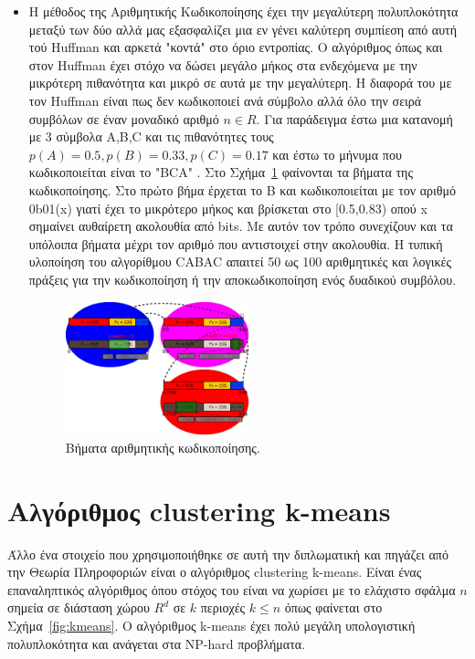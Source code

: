 \begin{itemize}
\newpage
  \item Η μέθοδος της Αριθμητικής Κωδικοποίησης έχει την μεγαλύτερη πολυπλοκότητα μεταξύ των δύο αλλά μας εξασφαλίζει μια εν γένει καλύτερη συμπίεση από αυτή τού Huffman και αρκετά "κοντά" στο όριο εντροπίας. Ο αλγόριθμος όπως και στον Huffman έχει στόχο να δώσει μεγάλο μήκος στα ενδεχόμενα με την μικρότερη πιθανότητα και μικρό σε αυτά με την μεγαλύτερη. Η διαφορά του με τον Huffman είναι πως δεν κωδικοποιεί ανά σύμβολο αλλά όλο την σειρά συμβόλων σε έναν μοναδικό αριθμό $n \in R$. Για παράδειγμα έστω μια κατανομή με 3 σύμβολα A,B,C και τις πιθανότητες τους $ p(A) = 0.5, p(B) = 0.33, p(C) = 0.17 $ και έστω το μήνυμα που κωδικοποιείται είναι το "BCA" . Στο Σχήμα~\ref{fig:ac} φαίνονται τα βήματα της κωδικοποίησης. Στο πρώτο βήμα έρχεται το B και κωδικοποιείται με τον αριθμό 0b01(x) γιατί έχει το μικρότερο μήκος και βρίσκεται στο [0.5,0.83) οπού x σημαίνει αυθαίρετη ακολουθία από bits. Με αυτόν τον τρόπο συνεχίζουν και τα υπόλοιπα βήματα μέχρι τον αριθμό που αντιστοιχεί στην ακολουθία. Η τυπική υλοποίηση του αλγορίθμου CABAC απαιτεί 50 ως 100 αριθμητικές και λογικές πράξεις για την κωδικοποίηση ή την αποκωδικοποίηση ενός δυαδικού συμβόλου.

      \begin{figure}[ht!]
          \centering
          \includegraphics[width=0.5\textwidth]{chapter3/ac.jpg}
          \caption{Βήματα αριθμητικής κωδικοποίησης. \cite{wiki:arcod}}
          \label{fig:ac}
      \end{figure}
\end{itemize}

\newpage
\section{Αλγόριθμος clustering k-means}
\label{section:sect34}

\indent Άλλο ένα στοιχείο που χρησιμοποιήθηκε σε αυτή την διπλωματική και πηγάζει από την Θεωρία Πληροφοριών είναι ο αλγόριθμος clustering k-means. Είναι ένας επαναληπτικός αλγόριθμος όπου στόχος του είναι να χωρίσει με το ελάχιστο σφάλμα $n$ σημεία σε διάσταση χώρου $R^d$ σε $k$ περιοχές $ k \leq n $ όπως φαίνεται στο Σχήμα~\ref{fig:kmeans}. O αλγόριθμος k-means έχει πολύ μεγάλη υπολογιστική πολυπλοκότητα και ανάγεται στα NP-hard προβλήματα.

